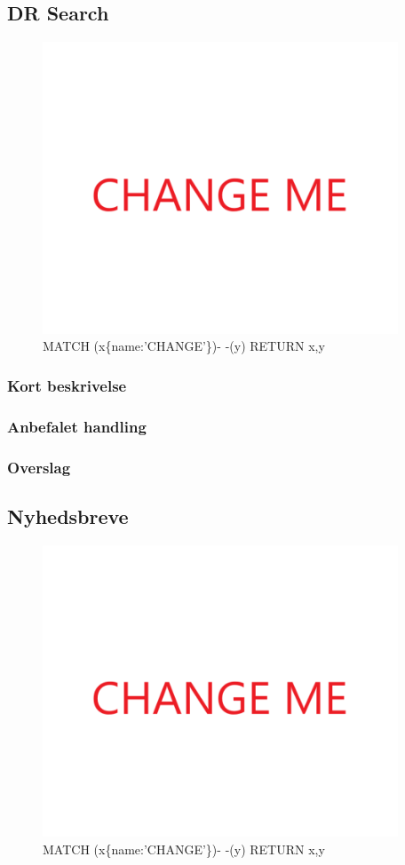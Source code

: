 \documentclass{article}
\begin{document}
\subsection{DR Search}
\begin{figure}[h]
\includegraphics[width=300pt]{CHANGE.PNG}
\caption{MATCH (x\{name:'CHANGE'\})- -(y) RETURN x,y}
\end{figure}
\subsubsection{Kort beskrivelse}
\subsubsection{Anbefalet handling}
\subsubsection{Overslag}
\subsection{Nyhedsbreve}
\begin{figure}[h]
\includegraphics[width=300pt]{CHANGE.PNG}
\caption{MATCH (x\{name:'CHANGE'\})- -(y) RETURN x,y}
\end{figure}
\end{document}
